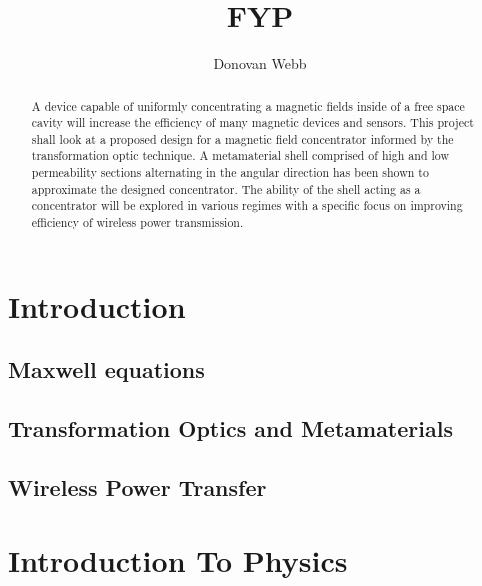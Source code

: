 \documentclass[11pt]{iopart}
\begin{document}
\title[]{FYP}

\author{Donovan Webb}

\address{Department of Physics,
University of Bath, Bath BA2 7AY, United Kingdom}

\begin{abstract}
\end{abstract}
\section{Introduction}

\subsection{Maxwell equations}
\subsection{Transformation Optics and Metamaterials}
\subsection{Wireless Power Transfer}
\begin{abstract}

A device capable of uniformly concentrating a magnetic fields inside of
a free space cavity will increase the efficiency of many magnetic
devices and sensors.  This project shall look at a proposed design for
a magnetic field concentrator informed by the transformation optic
technique. A metamaterial shell comprised of high and low permeability
sections alternating in the angular direction has been shown to
approximate the designed concentrator\cite{N2014}. The ability of the shell acting
as a concentrator will be explored in various regimes with a specific
focus on improving efficiency of wireless power transmission.

\end{abstract}
\section*{Introduction To Physics}
\end{document}
